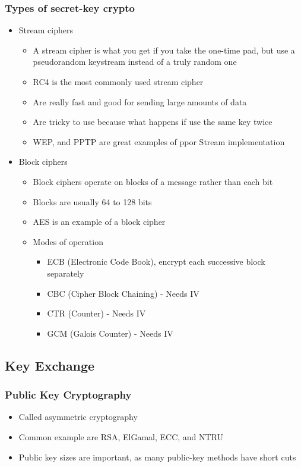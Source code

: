 \documentclass[twoside]{article}
\begin{document}
\subsubsection{Types of secret-key crypto}
\begin{itemize}
\item Stream ciphers
\begin{itemize}
\item A stream cipher is what you get if you take the one-time pad, but use a pseudorandom keystream instead of a truly random one
\item RC4 is the most commonly used stream cipher 
\item Are really fast and good for sending large amounts of data
\item Are tricky to use because what happens if use the same key twice
\item WEP, and PPTP are great examples of ppor Stream implementation
\end{itemize}
\item Block ciphers
\begin{itemize}
\item Block ciphers operate on blocks of a message rather than each bit
\item Blocks are usually 64 to 128 bits
\item AES is an example of a block cipher
\item Modes of operation
\begin{itemize}
\item ECB (Electronic Code Book), encrypt each successive block separately
\item CBC (Cipher Block Chaining) - Needs IV
\item CTR (Counter) - Needs IV
\item GCM (Galois Counter) - Needs IV
\end{itemize}
\end{itemize}
\end{itemize}
\subsection{Key Exchange}
\subsubsection{Public Key Cryptography}
\begin{itemize}
\item Called asymmetric cryptography
\item Common example are RSA, ElGamal, ECC, and NTRU
\item Public key sizes are important, as many public-key methods have short cuts
\end{itemize}
\end{document}
